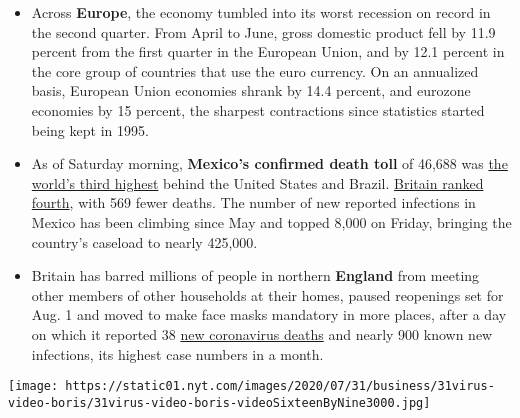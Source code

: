 \begin{itemize}
\item
  Across \textbf{Europe}, the economy tumbled into its worst recession
  on record in the second quarter. From April to June, gross domestic
  product fell by 11.9 percent from the first quarter in the European
  Union, and by 12.1 percent in the core group of countries that use the
  euro currency. On an annualized basis, European Union economies shrank
  by 14.4 percent, and eurozone economies by 15 percent, the sharpest
  contractions since statistics started being kept in 1995.
\item
  As of Saturday morning, \textbf{Mexico's confirmed death toll} of
  46,688 was
  \href{https://www.nytimes.com/interactive/2020/world/americas/mexico-coronavirus-cases.html}{the
  world's third highest} behind the United States and Brazil.
  \href{https://www.nytimes.com/interactive/2020/world/europe/united-kingdom-coronavirus-cases.html}{Britain
  ranked fourth}, with 569 fewer deaths. The number of new reported
  infections in Mexico has been climbing since May and topped 8,000 on
  Friday, bringing the country's caseload to nearly 425,000.
\item
  Britain has barred millions of people in northern \textbf{England}
  from meeting other members of other households at their homes, paused
  reopenings set for Aug. 1 and moved to make face masks mandatory in
  more places, after a day on which it reported 38
  \href{https://www.nytimes.com/interactive/2020/world/europe/united-kingdom-coronavirus-cases.html}{new
  coronavirus deaths} and nearly 900 known new infections, its highest
  case numbers in a month.
\end{itemize}

\texttt{[image: https://static01.nyt.com/images/2020/07/31/business/31virus-video-boris/31virus-video-boris-videoSixteenByNine3000.jpg]}

